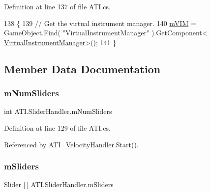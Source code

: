 Definition at line 137 of file A\+T\+I.\+cs.


\begin{DoxyCode}
138         \{
139             \textcolor{comment}{// Get the virtual instrument manager.}
140             \hyperlink{class_a_t_i_1_1_slider_handler_a5d19b4fb92b71c25a667defdda60213f}{mVIM} = GameObject.Find( \textcolor{stringliteral}{"VirtualInstrumentManager"} ).GetComponent<
      \hyperlink{class_virtual_instrument_manager}{VirtualInstrumentManager}>();
141         \}
\end{DoxyCode}


\subsection{Member Data Documentation}
\mbox{\label{class_a_t_i_1_1_slider_handler_ac762fad2fb523da79188668dde4488ec}} 
\subsubsection{\texorpdfstring{m\+Num\+Sliders}{mNumSliders}}
{\footnotesize\ttfamily int A\+T\+I.\+Slider\+Handler.\+m\+Num\+Sliders\hspace{0.3cm}{\ttfamily [protected]}}



Definition at line 129 of file A\+T\+I.\+cs.



Referenced by A\+T\+I\+\_\+\+Velocity\+Handler.\+Start().

\mbox{\label{class_a_t_i_1_1_slider_handler_a038a487fbd701cb786e77c210830be76}} 
\subsubsection{\texorpdfstring{m\+Sliders}{mSliders}}
{\footnotesize\ttfamily Slider \mbox{[}$\,$\mbox{]} A\+T\+I.\+Slider\+Handler.\+m\+Sliders\hspace{0.3cm}{\ttfamily [protected]}}



